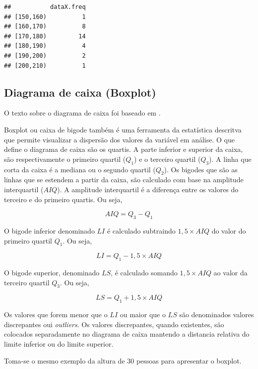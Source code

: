 \documentclass[
]{book}
\begin{document}
\begin{verbatim}
##           dataX.freq
## [150,160)          1
## [160,170)          8
## [170,180)         14
## [180,190)          4
## [190,200)          2
## [200,210)          1
\end{verbatim}

\hypertarget{diagrama-de-caixa-boxplot}{%
\subsection{Diagrama de caixa (Boxplot)}\label{diagrama-de-caixa-boxplot}}

O texto sobre o diagrama de caixa foi baseado em \citet{Morettin2013}.

Boxplot ou caixa de bigode também é uma ferramenta da estatística descritva que permite visualizar a dispersão dos valores da variável em análise. O que define o diagrama de caixa são os quartis. A parte inferior e superior da caixa, são respectivamente o primeiro quartil (\(Q_1\)) e o terceiro quartil (\(Q_3\)). A linha que corta da caixa é a mediana ou o segundo quartil (\(Q_2\)). Os bigodes que são as linhas que se estendem a partir da caixa, são calculado com base na amplitude interquartil (\(AIQ\)). A amplitude interquartil é a diferença entre os valores do terceiro e do primeiro quartis. Ou seja,

\begin{equation*}
  AIQ = Q_3 - Q_1
\end{equation*}

O bigode inferior denominado \(LI\) é calculado subtraindo \(1,5\times AIQ\) do valor do primeiro quartil \(Q_1\). Ou seja,

\begin{equation*}
  LI = Q_1 - 1,5 \times AIQ
\end{equation*}

O bigode superior, denominado \(LS\), é calculado somando \(1,5\times AIQ\) ao valor da terceiro quartil \(Q_3\). Ou seja,

\begin{equation*}
  LS = Q_1 + 1,5 \times AIQ
\end{equation*}

Os valores que forem menor que o \(LI\) ou maior que o \(LS\) são denominados valores discrepantes oui \emph{outliers}. Os valores discrepantes, quando existentes, são colocados separadamente no diagrama de caixa mantendo a distancia relativa do limite inferior ou do limite superior.

Toma-se o mesmo exemplo da altura de 30 pessoas para apresentar o boxplot.
\end{document}
